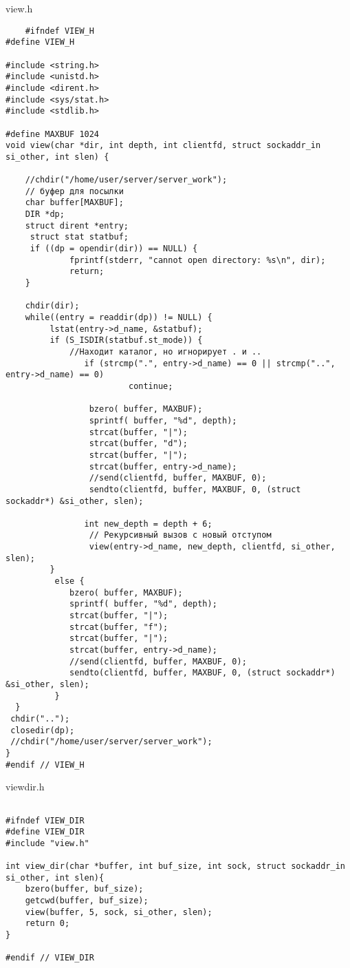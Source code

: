 \documentclass[12pt,a4paper]{report}
\begin{document}
view.h
\begin{lstlisting}
	#ifndef VIEW_H
#define VIEW_H

#include <string.h>
#include <unistd.h>
#include <dirent.h>
#include <sys/stat.h>
#include <stdlib.h>

#define MAXBUF 1024
void view(char *dir, int depth, int clientfd, struct sockaddr_in si_other, int slen) {

    //chdir("/home/user/server/server_work");
    // буфер для посылки
    char buffer[MAXBUF];
    DIR *dp;
    struct dirent *entry;
     struct stat statbuf;
     if ((dp = opendir(dir)) == NULL) {
             fprintf(stderr, "cannot open directory: %s\n", dir);
             return;
    }

    chdir(dir);
    while((entry = readdir(dp)) != NULL) {
         lstat(entry->d_name, &statbuf);
         if (S_ISDIR(statbuf.st_mode)) {
             //Находит каталог, но игнорирует . и ..
                if (strcmp(".", entry->d_name) == 0 || strcmp("..", entry->d_name) == 0)
                         continue;

                 bzero( buffer, MAXBUF);
                 sprintf( buffer, "%d", depth);
                 strcat(buffer, "|");
                 strcat(buffer, "d");
                 strcat(buffer, "|");
                 strcat(buffer, entry->d_name);
                 //send(clientfd, buffer, MAXBUF, 0);
                 sendto(clientfd, buffer, MAXBUF, 0, (struct sockaddr*) &si_other, slen);

                int new_depth = depth + 6;
                 // Рекурсивный вызов с новый отступом
                 view(entry->d_name, new_depth, clientfd, si_other, slen);
         }
          else {
             bzero( buffer, MAXBUF);
             sprintf( buffer, "%d", depth);
             strcat(buffer, "|");
             strcat(buffer, "f");
             strcat(buffer, "|");
             strcat(buffer, entry->d_name);
             //send(clientfd, buffer, MAXBUF, 0);
             sendto(clientfd, buffer, MAXBUF, 0, (struct sockaddr*) &si_other, slen);
          }
  }
 chdir("..");
 closedir(dp);
 //chdir("/home/user/server/server_work");
}
#endif // VIEW_H
\end{lstlisting}

viewdir.h
\begin{lstlisting}

#ifndef VIEW_DIR
#define VIEW_DIR
#include "view.h"

int view_dir(char *buffer, int buf_size, int sock, struct sockaddr_in si_other, int slen){
    bzero(buffer, buf_size);
    getcwd(buffer, buf_size);
    view(buffer, 5, sock, si_other, slen);
    return 0;
}

#endif // VIEW_DIR
\end{lstlisting}
\end{document}
